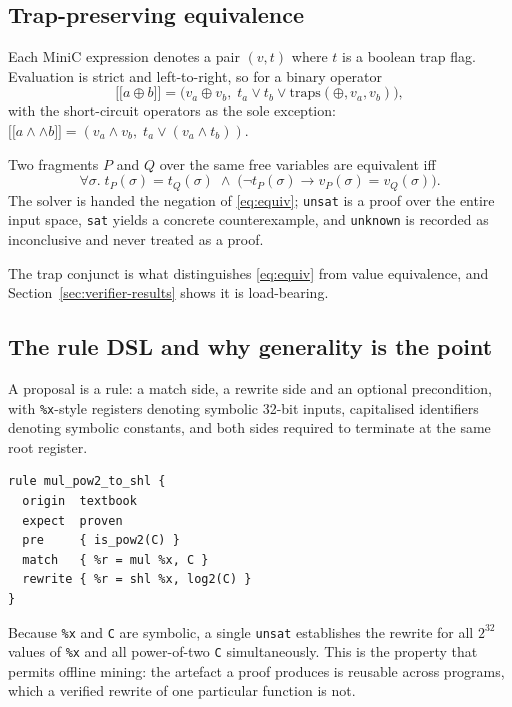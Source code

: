 \documentclass[conference]{IEEEtran}
\providecommand{\llbracket}{\ensuremath{[\![}}
\providecommand{\rrbracket}{\ensuremath{]\!]}}
\begin{document}
\subsection{Trap-preserving equivalence}
\label{sec:trap-equiv}

Each MiniC expression denotes a pair $(v, t)$ where $t$ is a boolean trap flag.
Evaluation is strict and left-to-right, so for a binary operator
\[
\llbracket a \oplus b \rrbracket = \bigl(v_a \oplus v_b,\;
t_a \vee t_b \vee \mathrm{traps}(\oplus, v_a, v_b)\bigr),
\]
with the short-circuit operators as the sole exception:
$\llbracket a \wedge\wedge b \rrbracket = (v_a \wedge v_b,\;
t_a \vee (v_a \wedge t_b))$.

Two fragments $P$ and $Q$ over the same free variables are equivalent iff
\begin{equation}
\forall \sigma.\;
t_P(\sigma) = t_Q(\sigma) \;\wedge\;
\bigl(\neg t_P(\sigma) \rightarrow v_P(\sigma) = v_Q(\sigma)\bigr).
\label{eq:equiv}
\end{equation}
The solver is handed the negation of \eqref{eq:equiv}; \texttt{unsat} is a
proof over the entire input space, \texttt{sat} yields a concrete
counterexample, and \texttt{unknown} is recorded as inconclusive and never
treated as a proof.

The trap conjunct is what distinguishes \eqref{eq:equiv} from value
equivalence, and Section~\ref{sec:verifier-results} shows it is load-bearing.

\subsection{The rule DSL and why generality is the point}

A proposal is a rule: a match side, a rewrite side and an optional
precondition, with \texttt{\%x}-style registers denoting symbolic 32-bit
inputs, capitalised identifiers denoting symbolic constants, and both sides
required to terminate at the same root register.

\begin{lstlisting}
rule mul_pow2_to_shl {
  origin  textbook
  expect  proven
  pre     { is_pow2(C) }
  match   { %r = mul %x, C }
  rewrite { %r = shl %x, log2(C) }
}
\end{lstlisting}

Because \texttt{\%x} and \texttt{C} are symbolic, a single \texttt{unsat}
establishes the rewrite for all $2^{32}$ values of \texttt{\%x} and all
power-of-two \texttt{C} simultaneously. This is the property that permits
offline mining: the artefact a proof produces is reusable across programs,
which a verified rewrite of one particular function is not.
\end{document}
